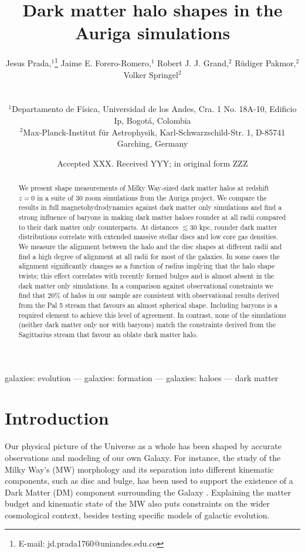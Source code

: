 \documentclass[usenatbib]{mnras}
\title[Dark matter halo shapes in Auriga] {Dark matter halo shapes in the Auriga simulations}
\author[Prada et al.]{
\parbox[t]{\textwidth}{
{Jesus Prada,$^{1}$\thanks{E-mail: jd.prada1760@uniandes.edu.co}}
{Jaime E. Forero-Romero,$^{1}$}
{Robert J. J. Grand,$^{2}$}
{R\"udiger Pakmor,$^{2}$}
{Volker Springel$^{2}$}
}
\\\\
$^{1}$Departamento de F\'isica, Universidad de los Andes, Cra. 1 No.
18A-10, Edificio Ip, Bogot\'a, Colombia\\
$^{2}$Max-Planck-Institut f\"ur Astrophysik, Karl-Schwarzschild-Str. 1, D-85741 Garching, Germany\\
}
\date{Accepted XXX. Received YYY; in original form ZZZ}
\begin{document}
\label{firstpage}
\pagerange{\pageref{firstpage}--\pageref{lastpage}}
\maketitle

\begin{abstract}
We present shape measurements of Milky Way-sized dark matter halos at
redshift $z=0$ in a suite of 30 zoom simulations from the Auriga
project. 
We compare the results in full magnetohydrodynamics against dark
matter only simulations and find a strong influence of baryons 
in making dark matter haloes rounder at all radii compared to their dark 
matter only counterparts.
At distances $\lesssim 30$ kpc, rounder dark matter distributions
correlate with extended massive stellar discs and low core gas 
densities.  
We measure the alignment between the halo and the disc shapes at
different radii and find a high degree of alignment at all radii for most 
of the galaxies.
In some cases the alignment significantly changes as a function of
radius implying that the halo shape twists; 
this effect correlates with recently formed bulges and is almost
absent in the dark matter only simulations.  
In a comparison against observational constraints we find that $20\%$
of halos in our sample are consistent with observational results derived
from the Pal 5 stream that favours an almost spherical shape.
Including baryons is a required element to achieve this
level of agreement. In contrast, none of the simulations (neither dark matter
only nor with baryons) match the constraints derived from the
Sagittarius stream that favour an oblate dark matter halo.
\end{abstract}

\begin{keywords}
galaxies: evolution --- galaxies: formation --- galaxies: haloes ---
dark matter
\end{keywords}



\section{Introduction}

Our physical picture of the Universe as a whole has been shaped by
accurate observations and modeling of our own Galaxy. 
For instance, the study of the Milky Way's (MW) morphology and its
separation into different kinematic components, such as 
disc and bulge, has been used to support the existence of a Dark Matter (DM) component surrounding the Galaxy
\citep{2000MNRAS.311..361O,2009PASJ...61..227S,2010JCAP...08..004C,2013ApJ...779..115B,Iocco15}. 
Explaining the matter budget and kinematic state of the MW also puts constraints on the wider cosmological context, besides testing specific models of galactic evolution.
\end{document}

